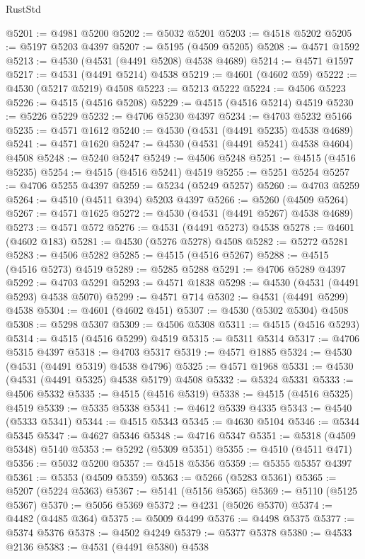 \begin{lexlean}{RustStd}
\begin{coremodule}
{\begin{coremodule}
{{{{{{{{{{{{{{{{{{{{{{{{{{{{{{{{{{{{{{{{{{{{{{{{{{{{{{{@5201 := @4981 @5200
@5202 := @5032 @5201
@5203 := @4518 @5202
@5205 := @5197 @5203 @4397
@5207 := @5195 (@4509 @5205)
@5208 := @4571 @1592
@5213 := @4530 (@4531 (@4491 @5208) @4538 @4689)
@5214 := @4571 @1597
@5217 := @4531 (@4491 @5214) @4538
@5219 := @4601 (@4602 @59)
@5222 := @4530 (@5217 @5219) @4508
@5223 := @5213 @5222
@5224 := @4506 @5223
@5226 := @4515 (@4516 @5208)
@5229 := @4515 (@4516 @5214) @4519
@5230 := @5226 @5229
@5232 := @4706 @5230 @4397
@5234 := @4703 @5232 @5166
@5235 := @4571 @1612
@5240 := @4530 (@4531 (@4491 @5235) @4538 @4689)
@5241 := @4571 @1620
@5247 := @4530 (@4531 (@4491 @5241) @4538 @4604) @4508
@5248 := @5240 @5247
@5249 := @4506 @5248
@5251 := @4515 (@4516 @5235)
@5254 := @4515 (@4516 @5241) @4519
@5255 := @5251 @5254
@5257 := @4706 @5255 @4397
@5259 := @5234 (@5249 @5257)
@5260 := @4703 @5259
@5264 := @4510 (@4511 @394) @5203 @4397
@5266 := @5260 (@4509 @5264)
@5267 := @4571 @1625
@5272 := @4530 (@4531 (@4491 @5267) @4538 @4689)
@5273 := @4571 @572
@5276 := @4531 (@4491 @5273) @4538
@5278 := @4601 (@4602 @183)
@5281 := @4530 (@5276 @5278) @4508
@5282 := @5272 @5281
@5283 := @4506 @5282
@5285 := @4515 (@4516 @5267)
@5288 := @4515 (@4516 @5273) @4519
@5289 := @5285 @5288
@5291 := @4706 @5289 @4397
@5292 := @4703 @5291
@5293 := @4571 @1838
@5298 := @4530 (@4531 (@4491 @5293) @4538 @5070)
@5299 := @4571 @714
@5302 := @4531 (@4491 @5299) @4538
@5304 := @4601 (@4602 @451)
@5307 := @4530 (@5302 @5304) @4508
@5308 := @5298 @5307
@5309 := @4506 @5308
@5311 := @4515 (@4516 @5293)
@5314 := @4515 (@4516 @5299) @4519
@5315 := @5311 @5314
@5317 := @4706 @5315 @4397
@5318 := @4703 @5317
@5319 := @4571 @1885
@5324 := @4530 (@4531 (@4491 @5319) @4538 @4796)
@5325 := @4571 @1968
@5331 := @4530 (@4531 (@4491 @5325) @4538 @5179) @4508
@5332 := @5324 @5331
@5333 := @4506 @5332
@5335 := @4515 (@4516 @5319)
@5338 := @4515 (@4516 @5325) @4519
@5339 := @5335 @5338
@5341 := @4612 @5339 @4335
@5343 := @4540 (@5333 @5341)
@5344 := @4515 @5343
@5345 := @4630 @5104
@5346 := @5344 @5345
@5347 := @4627 @5346
@5348 := @4716 @5347
@5351 := @5318 (@4509 @5348) @5140
@5353 := @5292 (@5309 @5351)
@5355 := @4510 (@4511 @471)
@5356 := @5032 @5200
@5357 := @4518 @5356
@5359 := @5355 @5357 @4397
@5361 := @5353 (@4509 @5359)
@5363 := @5266 (@5283 @5361)
@5365 := @5207 (@5224 @5363)
@5367 := @5141 (@5156 @5365)
@5369 := @5110 (@5125 @5367)
@5370 := @5056 @5369
@5372 := @4231 (@5026 @5370)
@5374 := @4482 (@4485 @364)
@5375 := @5009 @4499
@5376 := @4498 @5375
@5377 := @5374 @5376
@5378 := @4502 @4249
@5379 := @5377 @5378
@5380 := @4533 @2136
@5383 := @4531 (@4491 @5380) @4538
}}}}}}}}}}}}}}}}}}}}}}}}}}}}}}}}}}}}}}}}}}}}}}}}}}}}}}}
\end{coremodule}}
\end{coremodule}
\end{lexlean}
